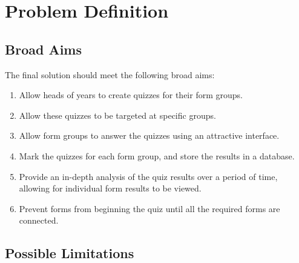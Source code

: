 \section{Problem Definition}

\subsection{Broad Aims}
The final solution should meet the following broad aims:

\begin{enumerate}
\item Allow heads of years to create quizzes for their form groups.
\item Allow these quizzes to be targeted at specific groups.
\item Allow form groups to answer the quizzes using an attractive interface.
\item Mark the quizzes for each form group, and store the results in a database.
\item Provide an in-depth analysis of the quiz results over a period of time, allowing for individual form results to be viewed.
\item Prevent forms from beginning the quiz until all the required forms are connected.
\end{enumerate}

\subsection{Possible Limitations}
